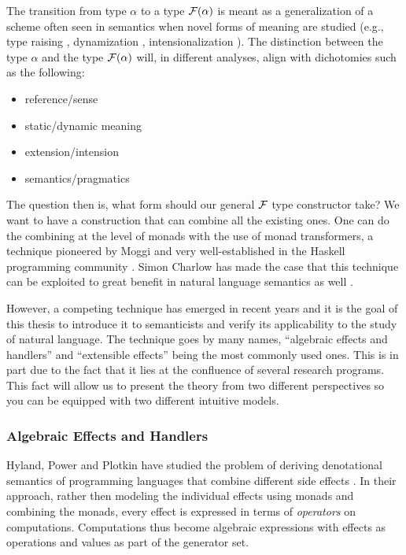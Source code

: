 The transition from type $\alpha$ to a type $\mathcal{F}(\alpha)$ is meant
as a generalization of a scheme often seen in semantics when novel forms of
meaning are studied (e.g., type raising \cite{montague1973proper},
dynamization \cite{lebedeva2012expression}, intensionalization
\cite{de2013note}). The distinction between the type $\alpha$ and the type
$\mathcal{F}(\alpha)$ will, in different analyses, align with dichotomies
such as the following:

\begin{itemize}
\item reference/sense
\item static/dynamic meaning
\item extension/intension
\item semantics/pragmatics
\end{itemize}

The question then is, what form should our general $\mathcal{F}$ type
constructor take? We want to have a construction that can combine all the
existing ones. One can do the combining at the level of monads with the use
of monad transformers, a technique pioneered by Moggi and very
well-established in the Haskell programming community
\cite{moggi1991notions}. Simon Charlow has made the case that this
technique can be exploited to great benefit in natural language semantics
as well \cite{charlow2014semantics}.

However, a competing technique has emerged in recent years and it is the
goal of this thesis to introduce it to semanticists and verify its
applicability to the study of natural language. The technique goes by many
names, ``algebraic effects and handlers'' and ``extensible effects'' being
the most commonly used ones. This is in part due to the fact that it lies
at the confluence of several research programs. This fact will allow us to
present the theory from two different perspectives so you can be equipped
with two different intuitive models.


\subsubsection*{Algebraic Effects and Handlers}

Hyland, Power and Plotkin have studied the problem of deriving denotational
semantics of programming languages that combine different side effects
\cite{hyland2006combining}. In their approach, rather then modeling the
individual effects using monads and combining the monads, every effect is
expressed in terms of \emph{operators} on computations. Computations thus
become algebraic expressions with effects as operations and values as part
of the generator set.

